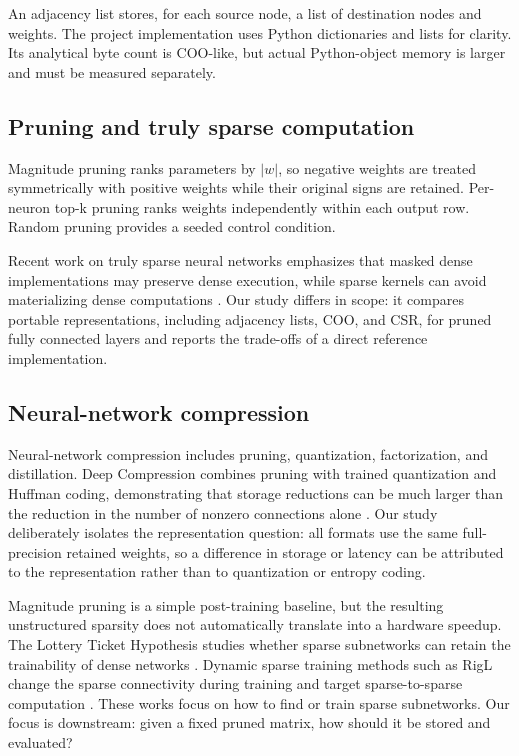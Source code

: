 \documentclass[11pt]{article}
\begin{document}
An adjacency list stores, for each source node, a list of destination nodes and
weights.  The project implementation uses Python dictionaries and lists for
clarity.  Its analytical byte count is COO-like, but actual Python-object
memory is larger and must be measured separately.

\subsection{Pruning and truly sparse computation}

Magnitude pruning ranks parameters by $|w|$, so negative weights are treated
symmetrically with positive weights while their original signs are retained.
Per-neuron top-k pruning ranks weights independently within each output row.
Random pruning provides a seeded control condition.

Recent work on truly sparse neural networks emphasizes that masked dense
implementations may preserve dense execution, while sparse kernels can avoid
materializing dense computations \cite{snack2026}.  Our study differs in scope:
it compares portable representations, including adjacency lists, COO, and CSR,
for pruned fully connected layers and reports the trade-offs of a direct
reference implementation.

\subsection{Neural-network compression}

Neural-network compression includes pruning, quantization, factorization, and
distillation.  Deep Compression combines pruning with trained quantization and
Huffman coding, demonstrating that storage reductions can be much larger than
the reduction in the number of nonzero connections alone \cite{deepcompression}.
Our study deliberately isolates the representation question: all formats use
the same full-precision retained weights, so a difference in storage or
latency can be attributed to the representation rather than to quantization or
entropy coding.

Magnitude pruning is a simple post-training baseline, but the resulting
unstructured sparsity does not automatically translate into a hardware
speedup.  The Lottery Ticket Hypothesis studies whether sparse subnetworks can
retain the trainability of dense networks \cite{lotteryticket}.  Dynamic sparse
training methods such as RigL change the sparse connectivity during training
and target sparse-to-sparse computation \cite{rigl}.  These works focus on how
to find or train sparse subnetworks.  Our focus is downstream: given a fixed
pruned matrix, how should it be stored and evaluated?
\end{document}
